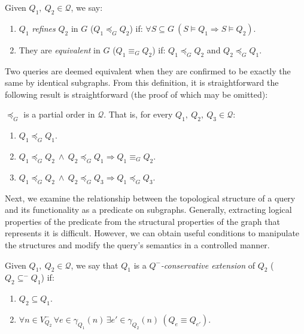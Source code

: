 \documentclass{article}%
\begin{document}
\begin{definition}{}
    Given $Q_1,\ Q_2\in \mathcal{Q}$, we say:
    \begin{enumerate}
    	\item $Q_1$ \emph{refines} $Q_2$ in $G$ ($Q_1\preceq_G Q_2$) if:
    	$\forall S\subseteq G\ (S\vDash Q_1 \Rightarrow S\vDash Q_2)$.
    	\item They are \emph{equivalent} in $G$ ($Q_1\equiv_G Q_2$) if:
    	$Q_1\preceq_G Q_2$ and $Q_2\preceq_G Q_1$.
    \end{enumerate} 
\end{definition}\medskip

Two queries are deemed equivalent when they are confirmed to be exactly the same by identical subgraphs. From this definition, it is straightforward the following result is straightforward (the proof of which may be omitted):

\begin{theorem}{}
    $\preceq_G$ is a partial order in $\mathcal{Q}$. That is, for every $Q_1,\ Q_2,\ Q_3 \in \mathcal{Q}$:
    \begin{enumerate}
        \item $Q_1\preceq_G Q_1$.
        \item $Q_1\preceq_G Q_2\ \wedge \ Q_2\preceq_G Q_1 \Rightarrow Q_1\equiv_G Q_2$.
        \item $Q_1\preceq_G Q_2\ \wedge \ Q_2\preceq_G Q_3 \Rightarrow Q_1\preceq_G Q_3$.
    \end{enumerate}
\end{theorem}\medskip

Next, we examine the relationship between the topological structure of a query and its functionality as a predicate on subgraphs. Generally, extracting logical properties of the predicate from the structural properties of the graph that represents it is difficult. However, we can obtain useful conditions to manipulate the structures and modify the query's semantics in a controlled manner.

\begin{definition}{}
    Given $Q_1,\ Q_2\in\mathcal{Q}$, we say that $Q_1$ is a \emph{$Q^-$-conservative extension} of $Q_2$ ($Q_2\subseteq^- Q_1$) if:
    \begin{enumerate}
        \item $Q_2\subseteq Q_1$.
        \item $\forall n\in V_{Q_2}^-\, \forall e\in \gamma_{Q_1}(n)\, \exists e'\in \gamma_{Q_2}(n)\ (Q_e\equiv Q_{e'})$.
    \end{enumerate}
\end{definition}\medskip
\end{document}
